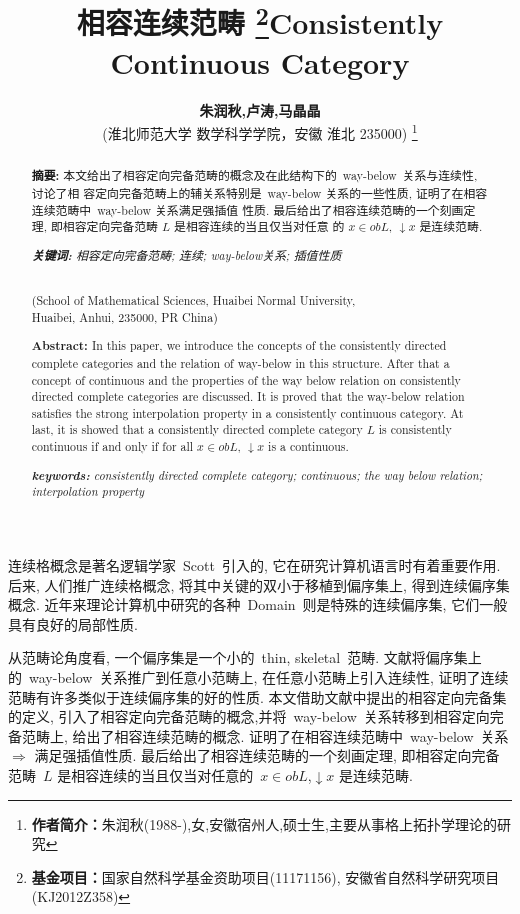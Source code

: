 \documentclass[c5size,a4paper,hyperref,fancyhdr,UTF8]{ctexart}
\title{ \songti\textbf{相容连续范畴}
    \thanks{ \textbf{基金项目：}国家自然科学基金资助项目(11171156), 安徽省自然科学研究项目(KJ2012Z358) }}
\author{ \songti\textbf{朱润秋,卢涛,马晶晶}\\
    (淮北师范大学 数学科学学院，安徽 淮北  235000)
    \thanks { \textbf{作者简介：}朱润秋(1988-),女,安徽宿州人,硕士生,主要从事格上拓扑学理论的研究 }}
\date{}
\theoremstyle{nonumberplain}
\theoremstyle{nonumberplain}
\newcommand{\upcite}[1]{\textsuperscript{\cite{#1}}}
\begin{document}
\maketitle

\begin{abstract}
\noindent \textbf{摘要: }本文给出了相容定向完备范畴的概念及在此结构下的~way-below~关系与连续性, 讨论了相
容定向完备范畴上的辅关系特别是~way-below 关系的一些性质, 证明了在相容连续范畴中~way-below 关系满足强插值
性质. 最后给出了相容连续范畴的一个刻画定理, 即相容定向完备范畴 $L$ 是相容连续的当且仅当对任意
的 $x\in obL$, $\downarrow x$ 是连续范畴.

\noindent \textit{\textbf{关键词: }相容定向完备范畴; 连续; way-below关系; 插值性质}
\end{abstract}

\begin{abstract}
\begin{center}
  \title{\textbf{Consistently Continuous Category}}
  \\(School of Mathematical Sciences, Huaibei Normal University,
  \\Huaibei, Anhui, 235000, PR China)
\end{center}

\noindent \textbf{Abstract:} In this paper, we introduce the concepts of the consistently directed complete categories and the relation of way-below in this structure. After that a concept of continuous and the properties of the way below relation on consistently directed complete categories are discussed. It is proved that the way-below relation satisfies the strong interpolation property in a consistently continuous category. At last, it is showed that a consistently directed complete category $L$ is consistently continuous if and only if for all $x\in obL$, $\downarrow x$ is a continuous.

\noindent \textit{\textbf{keywords: }consistently directed complete category; continuous; the way below relation; interpolation property}
\end{abstract}

连续格概念是著名逻辑学家~Scott~引入的, 它在研究计算机语言时有着重要作用. 后来, 人们推广连续格概念, 将其中关键的双小于移植到偏序集上, 得到连续偏序集概念\upcite{r1,r2}. 近年来理论计算机中研究的各种~Domain~则是特殊的连续偏序集, 它们一般具有良好的局部性质.

从范畴论角度看, 一个偏序集是一个小的~thin, skeletal~范畴\upcite{r3}. 文献\cite{r4}将偏序集上的~way-below~关系推广到任意小范畴上,
在任意小范畴上引入连续性, 证明了连续范畴有许多类似于连续偏序集的好的性质.
本文借助文献\cite{r5}中提出的相容定向完备集的定义, 引入了相容定向完备范畴的概念,并将~way-below~关系转移到相容定向完备范畴上,
给出了相容连续范畴的概念. 证明了在相容连续范畴中~way-below~关系 $\Rightarrow$ 满足强插值性质.
最后给出了相容连续范畴的一个刻画定理, 即相容定向完备范畴~$L$ 是相容连续的当且仅当对任意的~$x\in obL$,$\downarrow x$ 是连续范畴.
\end{document}
